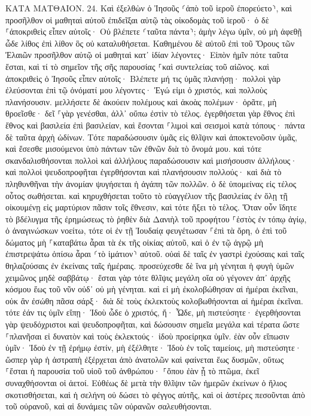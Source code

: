 \documentclass[twoside, 9pt]{extreport}
\begin{document}
ΚΑΤΑ ΜΑΤΘΑΙΟΝ.
24.
Καὶ ἐξελθὼν ὁ Ἰησοῦς ⸂ἀπὸ τοῦ ἱεροῦ ἐπορεύετο⸃, καὶ προσῆλθον οἱ μαθηταὶ αὐτοῦ ἐπιδεῖξαι αὐτῷ τὰς οἰκοδομὰς τοῦ ἱεροῦ· 
ὁ δὲ ⸀ἀποκριθεὶς εἶπεν αὐτοῖς· Οὐ βλέπετε ⸂ταῦτα πάντα⸃; ἀμὴν λέγω ὑμῖν, οὐ μὴ ἀφεθῇ ὧδε λίθος ἐπὶ λίθον ὃς οὐ καταλυθήσεται. 
Καθημένου δὲ αὐτοῦ ἐπὶ τοῦ Ὄρους τῶν Ἐλαιῶν προσῆλθον αὐτῷ οἱ μαθηταὶ κατ᾽ ἰδίαν λέγοντες· Εἰπὸν ἡμῖν πότε ταῦτα ἔσται, καὶ τί τὸ σημεῖον τῆς σῆς παρουσίας ⸀καὶ συντελείας τοῦ αἰῶνος. 
καὶ ἀποκριθεὶς ὁ Ἰησοῦς εἶπεν αὐτοῖς· Βλέπετε μή τις ὑμᾶς πλανήσῃ· 
πολλοὶ γὰρ ἐλεύσονται ἐπὶ τῷ ὀνόματί μου λέγοντες· Ἐγώ εἰμι ὁ χριστός, καὶ πολλοὺς πλανήσουσιν. 
μελλήσετε δὲ ἀκούειν πολέμους καὶ ἀκοὰς πολέμων· ὁρᾶτε, μὴ θροεῖσθε· δεῖ ⸀γὰρ γενέσθαι, ἀλλ᾽ οὔπω ἐστὶν τὸ τέλος. 
ἐγερθήσεται γὰρ ἔθνος ἐπὶ ἔθνος καὶ βασιλεία ἐπὶ βασιλείαν, καὶ ἔσονται ⸀λιμοὶ καὶ σεισμοὶ κατὰ τόπους· 
πάντα δὲ ταῦτα ἀρχὴ ὠδίνων. 
Τότε παραδώσουσιν ὑμᾶς εἰς θλῖψιν καὶ ἀποκτενοῦσιν ὑμᾶς, καὶ ἔσεσθε μισούμενοι ὑπὸ πάντων τῶν ἐθνῶν διὰ τὸ ὄνομά μου. 
καὶ τότε σκανδαλισθήσονται πολλοὶ καὶ ἀλλήλους παραδώσουσιν καὶ μισήσουσιν ἀλλήλους· 
καὶ πολλοὶ ψευδοπροφῆται ἐγερθήσονται καὶ πλανήσουσιν πολλούς· 
καὶ διὰ τὸ πληθυνθῆναι τὴν ἀνομίαν ψυγήσεται ἡ ἀγάπη τῶν πολλῶν. 
ὁ δὲ ὑπομείνας εἰς τέλος οὗτος σωθήσεται. 
καὶ κηρυχθήσεται τοῦτο τὸ εὐαγγέλιον τῆς βασιλείας ἐν ὅλῃ τῇ οἰκουμένῃ εἰς μαρτύριον πᾶσιν τοῖς ἔθνεσιν, καὶ τότε ἥξει τὸ τέλος. 
Ὅταν οὖν ἴδητε τὸ βδέλυγμα τῆς ἐρημώσεως τὸ ῥηθὲν διὰ Δανιὴλ τοῦ προφήτου ⸀ἑστὸς ἐν τόπῳ ἁγίῳ, ὁ ἀναγινώσκων νοείτω, 
τότε οἱ ἐν τῇ Ἰουδαίᾳ φευγέτωσαν ⸀ἐπὶ τὰ ὄρη, 
ὁ ἐπὶ τοῦ δώματος μὴ ⸀καταβάτω ἆραι τὰ ἐκ τῆς οἰκίας αὐτοῦ, 
καὶ ὁ ἐν τῷ ἀγρῷ μὴ ἐπιστρεψάτω ὀπίσω ἆραι ⸂τὸ ἱμάτιον⸃ αὐτοῦ. 
οὐαὶ δὲ ταῖς ἐν γαστρὶ ἐχούσαις καὶ ταῖς θηλαζούσαις ἐν ἐκείναις ταῖς ἡμέραις. 
προσεύχεσθε δὲ ἵνα μὴ γένηται ἡ φυγὴ ὑμῶν χειμῶνος μηδὲ σαββάτῳ· 
ἔσται γὰρ τότε θλῖψις μεγάλη οἵα οὐ γέγονεν ἀπ᾽ ἀρχῆς κόσμου ἕως τοῦ νῦν οὐδ᾽ οὐ μὴ γένηται. 
καὶ εἰ μὴ ἐκολοβώθησαν αἱ ἡμέραι ἐκεῖναι, οὐκ ἂν ἐσώθη πᾶσα σάρξ· διὰ δὲ τοὺς ἐκλεκτοὺς κολοβωθήσονται αἱ ἡμέραι ἐκεῖναι. 
τότε ἐάν τις ὑμῖν εἴπῃ· Ἰδοὺ ὧδε ὁ χριστός, ἤ· Ὧδε, μὴ πιστεύσητε· 
ἐγερθήσονται γὰρ ψευδόχριστοι καὶ ψευδοπροφῆται, καὶ δώσουσιν σημεῖα μεγάλα καὶ τέρατα ὥστε ⸀πλανῆσαι εἰ δυνατὸν καὶ τοὺς ἐκλεκτούς· 
ἰδοὺ προείρηκα ὑμῖν. 
ἐὰν οὖν εἴπωσιν ὑμῖν· Ἰδοὺ ἐν τῇ ἐρήμῳ ἐστίν, μὴ ἐξέλθητε· Ἰδοὺ ἐν τοῖς ταμείοις, μὴ πιστεύσητε· 
ὥσπερ γὰρ ἡ ἀστραπὴ ἐξέρχεται ἀπὸ ἀνατολῶν καὶ φαίνεται ἕως δυσμῶν, οὕτως ⸀ἔσται ἡ παρουσία τοῦ υἱοῦ τοῦ ἀνθρώπου· 
⸀ὅπου ἐὰν ᾖ τὸ πτῶμα, ἐκεῖ συναχθήσονται οἱ ἀετοί. 
Εὐθέως δὲ μετὰ τὴν θλῖψιν τῶν ἡμερῶν ἐκείνων ὁ ἥλιος σκοτισθήσεται, καὶ ἡ σελήνη οὐ δώσει τὸ φέγγος αὐτῆς, καὶ οἱ ἀστέρες πεσοῦνται ἀπὸ τοῦ οὐρανοῦ, καὶ αἱ δυνάμεις τῶν οὐρανῶν σαλευθήσονται. 
\end{document}
